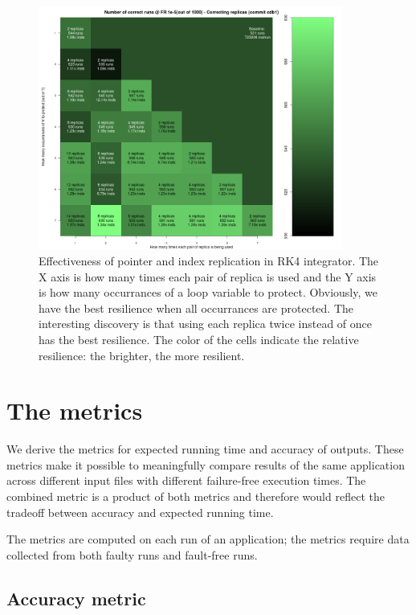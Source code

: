 \documentclass{article}
\begin{document}
\begin{figure}[h!]
\begin{center}
\includegraphics[width=10cm]{n_replica_correct_runs_cdb1.png}
\end{center}
\caption{Effectiveness of pointer and index replication in RK4 integrator. The X axis is how many times each pair of replica is used and the Y axis is how many occurrances of a loop variable to protect. Obviously, we have the best resilience when all occurrances are protected. The interesting discovery is that using each replica twice instead of once has the best resilience. The color of the cells indicate the relative resilience: the brighter, the more resilient.}
\label{fig:greenMtx}
\end{figure}

\section{The metrics}

We derive the metrics for expected running time and accuracy of outputs. These metrics make it possible to meaningfully compare results of the same application across different input files with different failure-free execution times. The combined metric is a product of both metrics and therefore would reflect the tradeoff between accuracy and expected running time.

The metrics are computed on each run of an application; the metrics require data collected from both faulty runs and fault-free runs.

\subsection{Accuracy metric}
\end{document}
